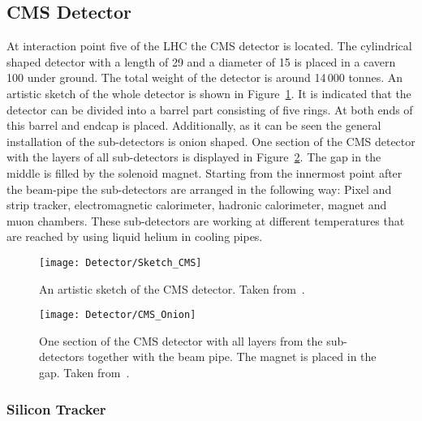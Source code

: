 \subsection{CMS Detector \label{LHCCMSCMSDet}}

At interaction point five of the LHC the CMS detector is located. The cylindrical shaped detector with a length of 29\m{} and a diameter of 15\m{} is placed in a cavern 100\m{} under ground. The total weight of the detector is around 14\,000 tonnes. An artistic sketch of the whole detector is shown in Figure~\ref{plot:LHCCMSWholeCMS}. It is indicated that the detector can be divided into a barrel part consisting of five rings. At both ends of this barrel and endcap is placed. Additionally, as it can be seen the general installation of the sub-detectors is onion shaped. One section of the CMS detector with the layers of all sub-detectors is displayed in Figure~\ref{plot:LHCCMSOnionCMS}. The gap in the middle is filled by the solenoid magnet. Starting from the innermost point after the beam-pipe the sub-detectors are arranged in the following way: Pixel and strip tracker, electromagnetic calorimeter, hadronic calorimeter, magnet and muon chambers. These sub-detectors are working at different temperatures that are reached by using liquid helium in cooling pipes.

\begin{figure}[!Hhtb]
  \centering
  \texttt{[image: Detector/Sketch\_CMS]}
  \caption[Artistic sketch of the CMS detector]{An artistic sketch of the CMS detector. Taken from~. \label{plot:LHCCMSWholeCMS}}
\end{figure}

\begin{figure}[!Hhtb]
  \centering
  \texttt{[image: Detector/CMS\_Onion]}
  \caption[One section of the CMS detector with all layers]{One section of the CMS detector with all layers from the sub-detectors together with the beam pipe. The magnet is placed in the gap. Taken from~. \label{plot:LHCCMSOnionCMS}}
\end{figure}

\subsubsection{Silicon Tracker}

